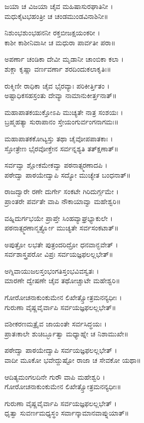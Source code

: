 ಜಯಾ ಚ ವಿಜಯಾ ಚೈವ ಮಹಿಷಾಸುರಘಾತಿನೀ ।\\
ಮಧುಕೈಟಭಹಂತ್ರೀ ಚ ಚಂಡಮುಂಡವಿನಾಶಿನೀ॥

ನಿಶುಂಭಶುಂಭಹನನೀ ರಕ್ತಬೀಜಕ್ಷಯಂಕರೀ ।\\
ಕಾಶೀ ಕಾಶೀನಿವಾಸೀ ಚ ಮಧುರಾ ಪಾರ್ವತೀ ಪರಾ॥

ಅಪರ್ಣಾ ಚಂಡಿಕಾ ದೇವೀ ಮೃಡಾನೀ ಚಾಂಬಿಕಾ ಕಲಾ ।\\
ಶುಕ್ಲಾ ಕೃಷ್ಣಾ ವರ್ಣವರ್ಣಾ ಶರದಿಂದುಕಲಾಕೃತಿಃ॥

ರುಕ್ಮಿಣೀ ರಾಧಿಕಾ ಚೈವ ಭೈರವ್ಯಾಃ ಪರಿಕೀರ್ತ್ತಿತಂ ।\\
ಅಷ್ಟಾಧಿಕಸಹಸ್ರಂತು ದೇವ್ಯಾ ನಾಮಾನುಕೀರ್ತ್ತನಾತ್॥

ಮಹಾಪಾತಕಯುಕ್ತೋಽಪಿ ಮುಚ್ಯತೇ ನಾತ್ರ ಸಂಶಯಃ ।\\
ಬ್ರಹ್ಮಹತ್ಯಾ ಸುರಾಪಾನಂ ಸ್ತೇಯಂಗುರ್ವಂಗನಾಗಮಃ॥

ಮಹಾಪಾತಕಕೋಟ್ಯಸ್ತು ತಥಾ ಚೈವೋಪಪಾತಕಾಃ ।\\
ಸ್ತೋತ್ರೇಣ ಭೈರವೋಕ್ತೇನ ಸರ್ವನ್ನಶ್ಯತಿ ತತ್ಕ್ಷಣಾತ್॥

ಸರ್ವವ್ವಾ ಶ್ಲೋಕಮೇಕವ್ವಾ ಪಠನಾತ್ಸ್ಮರಣಾದಪಿ ।\\
ಪಠೇದ್ವಾ ಪಾಠಯೇದ್ವಾಪಿ ಸದ್ಯೋ ಮುಚ್ಯೇತ ಬಂಧನಾತ್॥

ರಾಜದ್ವಾರೇ ರಣೇ ದುರ್ಗೇ ಸಂಕಟೇ ಗಿರಿದುರ್ಗ್ಗಮೇ ।\\
ಪ್ರಾಂತರೇ ಪರ್ವತೇ ವಾಪಿ ನೌಕಾಯಾವ್ವಾ ಮಹೇಶ್ವರಿ॥

ವಹ್ನಿದುರ್ಗಭಯೇ ಪ್ರಾಪ್ತೇ ಸಿಂಹವ್ಯಾಘ್ರಭ್ಯಾಕುಲೇ ।\\
ಪಠನಾತ್ಸ್ಮರಣಾನ್ಮರ್ತ್ತ್ಯೋ ಮುಚ್ಯತೇ ಸರ್ವಸಂಕಟಾತ್॥

ಅಪುತ್ರೋ ಲಭತೇ ಪುತ್ರಂದರಿದ್ರೋ ಧನವಾನ್ಭವೇತ್ ।\\
ಸರ್ವಶಾಸ್ತ್ರಪರೋ ವಿಪ್ರಃ ಸರ್ವಯಜ್ಞಫಲಲ್ಲಭೇತ್॥

ಅಗ್ನಿವಾಯುಜಲಸ್ತಂಭಂಗತಿಸ್ತಂಭವಿವಸ್ವತಃ ।\\
ಮಾರಣೇ ದ್ವೇಷಣೇ ಚೈವ ತಥೋಚ್ಚಾಟೇ ಮಹೇಶ್ವರಿ॥

ಗೋರೋಚನಾಕುಂಕುಮೇನ ಲಿಖೇತ್ಸ್ತೋತ್ರಮನನ್ಯಧೀಃ ।\\
ಗುರುಣಾ ವೈಷ್ಣವೈರ್ವಾಪಿ ಸರ್ವಯಜ್ಞಫಲಲ್ಲಭೇತ್॥

ವಶೀಕರಣಮತ್ರೈವ ಜಾಯಂತೇ ಸರ್ವಸಿದ್ಧಯಃ ।\\
ಪ್ರಾತಃಕಾಲೇ ಶುಚಿರ್ಬ್ಭೂತ್ವಾ ಮಧ್ಯಾಹ್ನೇ ಚ ನಿಶಾಮುಖೇ॥

ಪಠೇದ್ವಾ ಪಾಠಯೇದ್ವಾಪಿ ಸರ್ವಯಜ್ಞಫಲಲ್ಲಭೇತ್ ।\\
ವಾದೀ ಮೂಕೋ ಭವೇದ್ದುಷ್ಟೋ ರಾಜಾ ಚ ಸೇವಕೋ ಯಥಾ॥

ಆದಿತ್ಯಮಂಗಲದಿನೇ ಗುರೌ ವಾಪಿ ಮಹೇಶ್ವರಿ ।\\
ಗೋರೋಚನಾಕುಂಕುಮೇನ ಲಿಖೇತ್ಸ್ತೋತ್ರಮನನ್ಯಧೀಃ॥

ಗುರುಣಾ ವೈಷ್ಣವೈರ್ವಾಪಿ ಸರ್ವಯಜ್ಞಫಲಲ್ಲಭೇತ್ ।\\
ಧೃತ್ವಾ ಸುವರ್ಣಮಧ್ಯಸ್ಥಂ ಸರ್ವಾನ್ಕಾಮಾನವಾಪ್ನುಯಾತ್॥

